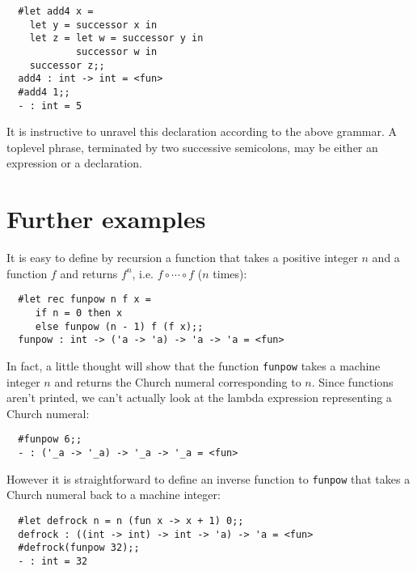 \begin{boxed}\begin{verbatim}
  #let add4 x =
    let y = successor x in
    let z = let w = successor y in
            successor w in
    successor z;;
  add4 : int -> int = <fun>
  #add4 1;;
  - : int = 5
\end{verbatim}\end{boxed}

It is instructive to unravel this declaration according to the above grammar. A
toplevel phrase, terminated by two successive semicolons, may be either an
expression or a declaration.

\section{Further examples}

It is easy to define by recursion a function that takes a positive integer $n$
and a function $f$ and returns $f^n$, i.e. $f \circ \cdots \circ f$ ($n$
times):

\begin{boxed}\begin{verbatim}
  #let rec funpow n f x =
     if n = 0 then x
     else funpow (n - 1) f (f x);;
  funpow : int -> ('a -> 'a) -> 'a -> 'a = <fun>
\end{verbatim}\end{boxed}

In fact, a little thought will show that the function {\tt funpow} takes a
machine integer $n$ and returns the Church numeral corresponding to $n$. Since
functions aren't printed, we can't actually look at the lambda expression
representing a Church numeral:

\begin{boxed}\begin{verbatim}
  #funpow 6;;
  - : ('_a -> '_a) -> '_a -> '_a = <fun>
\end{verbatim}\end{boxed}

However it is straightforward to define an inverse function to {\tt funpow}
that takes a Church numeral back to a machine integer:

\begin{boxed}\begin{verbatim}
  #let defrock n = n (fun x -> x + 1) 0;;
  defrock : ((int -> int) -> int -> 'a) -> 'a = <fun>
  #defrock(funpow 32);;
  - : int = 32
\end{verbatim}\end{boxed}

